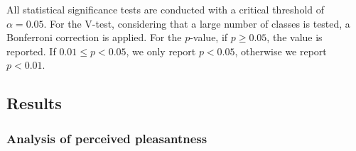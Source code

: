 \documentclass[12pt]{elsarticle}
\providecommand{\DIFaddbegin}{} %
\providecommand{\DIFaddend}{} %
\begin{document}

All statistical significance tests are conducted with a critical threshold of $\alpha=0.05$. For the V-test, considering that a large number of classes is tested, a Bonferroni correction is applied. For the $p$-value, if $p\geq0.05$, the value is reported. If $0.01\leq p<0.05$, we only report $p<0.05$, otherwise we report $p<0.01$.

\DIFaddbegin 

\DIFaddend \subsection{Results}

\subsubsection*{Analysis of perceived pleasantness}

\end{document}
